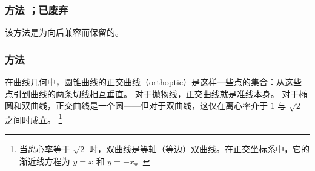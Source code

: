 \subsubsection{方法 ；已废弃}
\label{ssub:method_conic_in_out}

该方法是为向后兼容而保留的。


\subsubsection{方法 }
\label{ssub:method_conic_orthoptic}

在曲线几何中，圆锥曲线的正交曲线（orthoptic）是这样一些点的集合：从这些点引到曲线的两条切线相互垂直。
对于抛物线，正交曲线就是准线本身。
对于椭圆和双曲线，正交曲线是一个圆——但对于双曲线，这仅在离心率介于 \( 1 \) 与 \( \sqrt{2} \) 之间时成立。
\footnote{当离心率等于 \( \sqrt{2} \) 时，双曲线是等轴（等边）双曲线。在正交坐标系中，它的渐近线方程为 \( y = x \) 和 \( y = -x \)。}

\vspace{1em}

